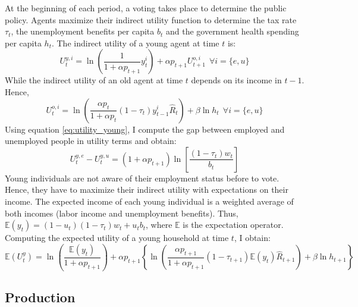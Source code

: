 At the beginning of each period, a voting takes place to determine the public policy. Agents maximize their indirect utility function to determine the tax rate $\tau_t$, the unemployment benefits per capita $b_t$ and the government health spending per capita $h_t$. 
The indirect utility of a young agent at time $t$ is:
	\begin{equation}\label{eq:utility_young}
		U_t^{y,i} = \ln\left(\frac{1}{1+\alpha p_{t+1}}y_t^i\right)+ \alpha p_{t+1} U_{t+1}^{o,i} ~~ \forall i = \lbrace e,u \rbrace
	\end{equation}
While the indirect utility of an old agent at time $t$ depends on its income in $t-1$. Hence,
	\begin{equation}\label{eq:utility_old}
		U_t^{o,i} = \ln\left(\frac{\alpha p_t}{1+\alpha p_t}(1-\tau_t)y_{t-1}^i\hat{R}_t\right) + \beta \ln h_t ~~ \forall i = \lbrace e,u \rbrace
	\end{equation}
Using equation \ref{eq:utility_young}, I compute the gap between employed and unemployed people in utility terms and obtain:
	\begin{equation}\label{eq:utility_young_gap}
		U_t^{y,e} - U_t^{y,u} = (1+\alpha p_{t+1})\ln\left[\frac{(1-\tau_t)w_t}{b_t}\right]
	\end{equation}
Young individuals are not aware of their employment status before to vote. Hence, they have to maximize their indirect utility with expectations on their income. The expected income of each young individual is a weighted average of both incomes (labor income and unemployment benefits). Thus, $\mathbb{E}(y_t) = (1-u_t)(1-\tau_t)w_t + u_tb_t$, where $\mathbb{E}$ is the expectation operator. Computing the expected utility of a young household at time $t$, I obtain:
	\begin{equation}\label{eq:expected_utility_young}
		\mathbb{E}({U}_t^y) = \ln\left(\frac{\mathbb{E}\left(y_t\right)}{1+\alpha p_{t+1}}\right) + \alpha p_{t+1}\left\lbrace \ln\left(\frac{\alpha p_{t+1}}{1+\alpha p_{t+1}}(1-\tau_{t+1})\mathbb{E}(y_t)\hat{R}_{t+1}\right) + \beta \ln h_{t+1} \right\rbrace
	\end{equation}

\subsection{Production}\label{subsec:production}

